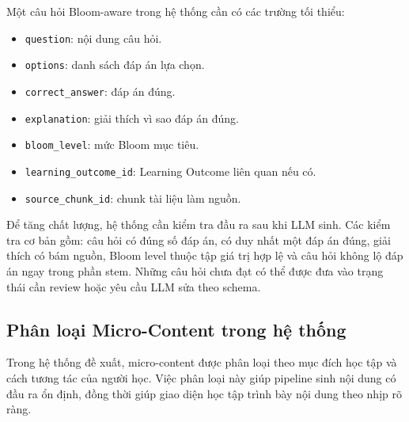 Một câu hỏi Bloom-aware trong hệ thống cần có các trường tối thiểu:

\begin{itemize}
    \item \texttt{question}: nội dung câu hỏi.
    \item \texttt{options}: danh sách đáp án lựa chọn.
    \item \texttt{correct\_answer}: đáp án đúng.
    \item \texttt{explanation}: giải thích vì sao đáp án đúng.
    \item \texttt{bloom\_level}: mức Bloom mục tiêu.
    \item \texttt{learning\_outcome\_id}: Learning Outcome liên quan nếu có.
    \item \texttt{source\_chunk\_id}: chunk tài liệu làm nguồn.
\end{itemize}

Để tăng chất lượng, hệ thống cần kiểm tra đầu ra sau khi LLM sinh. Các kiểm
tra cơ bản gồm: câu hỏi có đúng số đáp án, có duy nhất một đáp án đúng, giải
thích có bám nguồn, Bloom level thuộc tập giá trị hợp lệ và câu hỏi không lộ
đáp án ngay trong phần stem. Những câu hỏi chưa đạt có thể được đưa vào trạng
thái cần review hoặc yêu cầu LLM sửa theo schema.

\subsection{Phân loại Micro-Content trong hệ thống}
\label{subsec:phan-loai-micro-content}

Trong hệ thống đề xuất, micro-content được phân loại theo mục đích học tập và
cách tương tác của người học. Việc phân loại này giúp pipeline sinh nội dung có
đầu ra ổn định, đồng thời giúp giao diện học tập trình bày nội dung theo nhịp
rõ ràng.

